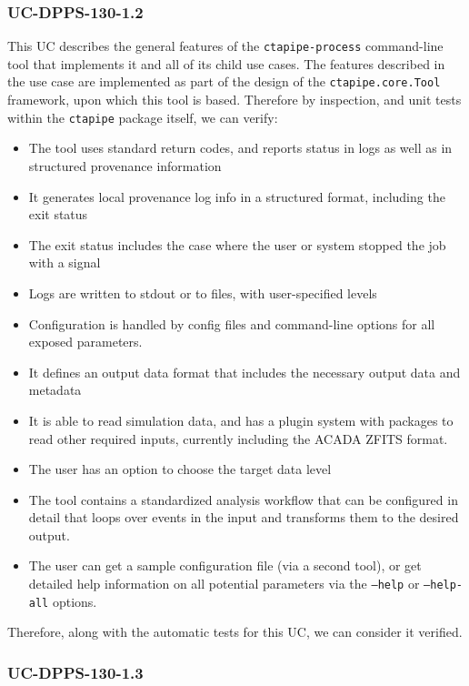 \subsubsection{UC-DPPS-130-1.2}

This UC describes the general features of the \texttt{ctapipe-process}
command-line tool that implements it and all of its child use cases. The
features described in the use case are implemented as part of the design of the
\texttt{ctapipe.core.Tool} framework, upon which this tool is based. Therefore
by inspection, and unit tests within the \texttt{ctapipe} package itself, we can
verify:

\begin{itemize}
  \item The tool uses standard return codes, and reports status in logs as well as in structured provenance information
  \item It generates local provenance log info in a structured format, including the exit status
  \item The exit status includes the case where the user or system stopped the job with a signal
  \item Logs are written to stdout or to files, with user-specified levels
  \item Configuration is handled by config files and command-line options for
        all exposed parameters.
  \item It defines an output data format that includes the necessary output data and metadata
  \item It is able to read simulation data, and has a plugin system  with packages to read other required inputs, currently including the ACADA ZFITS format.
  \item The user has an option to choose the target data level
  \item The tool contains a standardized analysis workflow that can be configured in detail that loops over events in the input and transforms them to the desired output.
  \item The user can get a sample configuration file (via a second tool), or get detailed help information on all potential parameters via the \texttt{--help} or \texttt{--help-all} options.
\end{itemize}

Therefore, along with the automatic tests for this UC, we can consider it verified.

\subsubsection{UC-DPPS-130-1.3}

